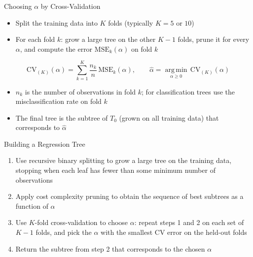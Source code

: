 \begin{frame}{Choosing $\alpha$ by Cross-Validation}
    \begin{itemize}
        \item Split the training data into $K$ folds (typically $K = 5$ or $10$)
        \item For each fold $k$: grow a large tree on the other $K-1$ folds, prune it for every $\alpha$, and compute the error $\mathrm{MSE}_k(\alpha)$ on fold $k$
    \end{itemize}
    \[
        \mathrm{CV}_{(K)}(\alpha) = \sum_{k=1}^{K} \frac{n_k}{n}\, \mathrm{MSE}_k(\alpha), \qquad
        \hat{\alpha} = \operatorname*{arg\,min}_{\alpha \ge 0}\, \mathrm{CV}_{(K)}(\alpha)
    \]
    \begin{itemize}
        \item $n_k$ is the number of observations in fold $k$; for classification trees use the misclassification rate on fold $k$
        \item The final tree is the subtree of $T_0$ (grown on all training data) that corresponds to $\hat{\alpha}$
    \end{itemize}
\end{frame}


\begin{frame}{Building a Regression Tree}
    \begin{enumerate}
        \item Use recursive binary splitting to grow a large tree on the training data, stopping when each leaf has fewer than some minimum number of observations
        \item Apply cost complexity pruning to obtain the sequence of best subtrees as a function of $\alpha$
        \item Use $K$-fold cross-validation to choose $\alpha$: repeat steps 1 and 2 on each set of $K-1$ folds, and pick the $\alpha$ with the smallest CV error on the held-out folds
        \item Return the subtree from step 2 that corresponds to the chosen $\alpha$
    \end{enumerate}
\end{frame}


